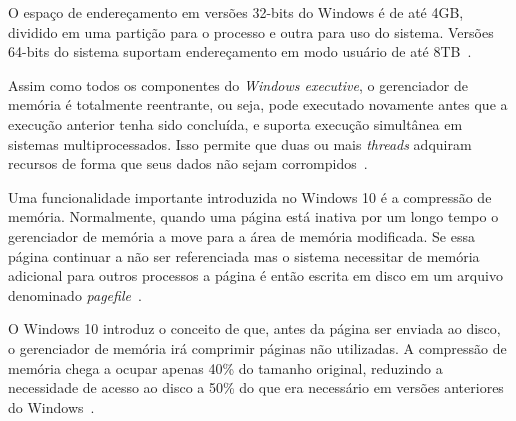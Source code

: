 	O espaço de endereçamento em versões 32-bits do Windows é de até 4GB, dividido em uma partição para o processo e outra para uso do sistema. Versões 64-bits do sistema suportam endereçamento em modo usuário de até 8TB~\cite{w10_memory}.
	
	Assim como todos os componentes do \emph{Windows executive}, o gerenciador de memória é totalmente reentrante, ou seja, pode executado novamente antes que a execução anterior tenha sido concluída, e suporta execução simultânea em sistemas multiprocessados. Isso permite que duas ou mais \emph{threads} adquiram recursos de forma que seus dados não sejam corrompidos~\cite{internals_pt2}.

	Uma funcionalidade importante introduzida no Windows 10 é a compressão de memória. Normalmente, quando uma página está inativa por um longo tempo o gerenciador de memória a move para a área de memória modificada. Se essa página continuar a não ser referenciada mas o sistema necessitar de memória adicional para outros processos a página é então escrita em disco em um arquivo denominado \emph{pagefile}~\cite{w10_memory}.
	
	O Windows 10 introduz o conceito de que, antes da página ser enviada ao disco, o gerenciador de memória irá comprimir páginas não utilizadas. A compressão de memória chega a ocupar apenas 40\% do tamanho original, reduzindo a necessidade de acesso ao disco a 50\% do que era necessário em versões anteriores do Windows~\cite{memory_compression}.